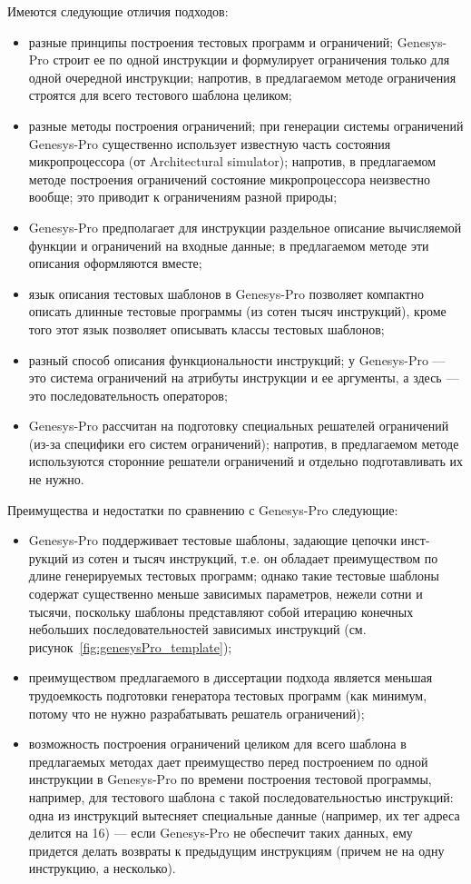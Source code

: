 Имеются следующие отличия подходов:
\begin{itemize}
    \item разные принципы построения тестовых программ и ограничений; Genesys-Pro строит ее по одной инструкции и формулирует ограничения только для одной очередной инструкции; напротив, в предлагаемом методе ограничения строятся для всего тестового шаблона целиком;
    \item разные методы построения ограничений; при генерации системы ограничений Genesys-Pro существенно использует известную часть состояния микропроцессора (от Architectural simulator); напротив, в предлагаемом методе построения ограничений состояние микропроцессора неизвестно вообще; это приводит к ограничениям разной природы;
    \item Genesys-Pro предполагает для инструкции раздельное описание вычисляемой функции и ограничений на входные данные; в предлагаемом методе эти описания оформляются вместе;
    \item язык описания тестовых шаблонов в Genesys-Pro позволяет компактно описать длинные тестовые программы (из сотен тысяч инструкций), кроме того этот язык позволяет описывать классы тестовых шаблонов;
    \item разный способ описания функциональности инструкций; у Genesys-Pro --- это система ограничений на атрибуты инструкции и ее аргументы, а здесь --- это последовательность операторов;
    \item Genesys-Pro рассчитан на подготовку специальных решателей ограничений (из-за специфики его систем ограничений); напротив, в предлагаемом методе используются сторонние решатели ограничений и отдельно подготавливать их не нужно.
\end{itemize}

Преимущества и недостатки по сравнению с Genesys-Pro следующие:
\begin{itemize}
    \item Genesys-Pro поддерживает тестовые шаблоны, задающие цепочки инст{-}рукций из сотен и тысяч инструкций, т.е. он обладает преимуществом по длине генерируемых тестовых программ; однако такие тестовые шаблоны содержат существенно меньше зависимых параметров, нежели сотни и тысячи, поскольку шаблоны представляют собой итерацию конечных небольших последовательностей зависимых инструкций (см. рисунок~\ref{fig:genesysPro_template});
    \item преимуществом предлагаемого в диссертации подхода является меньшая трудоемкость подготовки генератора тестовых программ (как минимум, потому что не нужно разрабатывать решатель ограничений);
    \item возможность построения ограничений целиком для всего шаблона в предлагаемых методах дает преимущество перед построением по одной инструкции в Genesys-Pro по времени построения тестовой программы, например, для тестового шаблона с такой последовательностью инструкций: одна из инструкций вытесняет специальные данные (например, их тег адреса делится на 16) --- если Genesys-Pro не обеспечит таких данных, ему придется делать возвраты к предыдущим инструкциям (причем не на одну инструкцию, а несколько).
\end{itemize}

